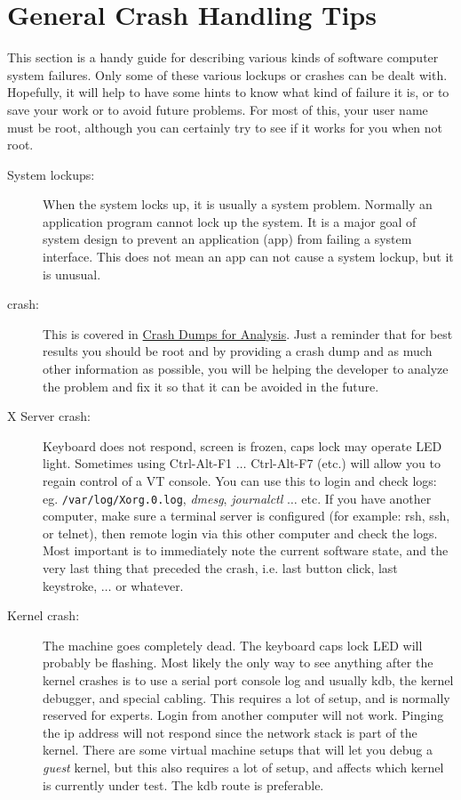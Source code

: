 \section{General Crash Handling Tips}%
\label{sec:general_crash_tips}

This section is a handy guide for describing various kinds of software computer system failures.  Only some of these various lockups or crashes can be dealt with.  Hopefully, it will help to have some hints to know what kind of failure it is, or to save your work or to avoid future problems.  For most of this, your user name must be root, although you can certainly try to see if it works for you when not root.

\begin{description}
	\item[System lockups:] When the system locks up, it is usually a system problem.  Normally an application program cannot lock up the system.  It is a major goal of system design to prevent an application (app) from failing a system interface.  This does not mean an app can not cause a system lockup, but it is unusual.
	\item[\CGG{} crash:] This is covered in  \hyperref[cha:crash_dumps_analysis]{Crash Dumps for Analysis}.  Just a reminder that for best results you should be root and by providing a crash dump and as much other information as possible, you will be helping the developer to analyze the problem and fix it so that it can be avoided in the future.
	\item[X Server crash:] Keyboard does not respond, screen is frozen, caps lock may operate LED light.  Sometimes using Ctrl-Alt-F1 $\dots$ Ctrl-Alt-F7 (etc.) will allow you to regain control of a VT console.  You can use this to login and check logs: eg. \texttt{/var/log/Xorg.0.log}, \textit{dmesg}, \textit{journalctl} $\dots$ etc.  If you have another computer, make sure a terminal server is configured (for example: rsh, ssh, or telnet), then remote login via this other computer and check the logs.  Most important is to immediately note the current software state, and the very last thing that preceded the crash, i.e. last button click, last keystroke, $\dots$ or whatever.
	\item[Kernel crash:] The machine goes completely dead.  The keyboard caps lock LED will probably be flashing.  Most likely the only way to see anything after the kernel crashes is to use a serial port console log and usually kdb, the kernel debugger, and special cabling.  This requires a lot of setup, and is normally reserved for experts.  Login from another computer will not work.  Pinging the ip address will not respond since the network stack is part of the kernel.  There are some virtual machine setups that will let you debug a \textit{guest} kernel, but this also requires a lot of setup, and affects which kernel is currently under test.  The kdb route is preferable.

\end{description}
